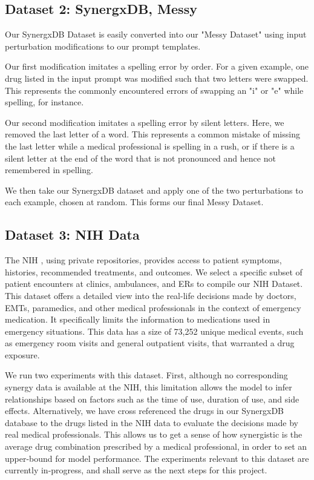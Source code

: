 \documentclass[11pt]{article}
\begin{document}
\subsection{Dataset 2: SynergxDB, Messy}
Our SynergxDB Dataset is easily converted into our "Messy Dataset" using input perturbation modifications to our prompt templates.

Our first modification imitates a spelling error by order. For a given example, one drug listed in the input prompt was modified such that two letters were swapped. This represents the commonly encountered errors of swapping an "i" or "e" while spelling, for instance.

Our second modification imitates a spelling error by silent letters. Here, we removed the last letter of a word. This represents a common mistake of missing the last letter while a medical professional is spelling in a rush, or if there is a silent letter at the end of the word that is not pronounced and hence not remembered in spelling.

We then take our SynergxDB dataset and apply one of the two perturbations to each example, chosen at random. This forms our final Messy Dataset.

\subsection{Dataset 3: NIH Data}
The NIH \cite{WinNT}, using private repositories, provides access to patient symptoms, histories, recommended treatments, and outcomes. We select a specific subset of patient encounters at clinics, ambulances, and ERs to compile our NIH Dataset. This dataset offers a detailed view into the real-life decisions made by doctors, EMTs, paramedics, and other medical professionals in the context of emergency medication. It specifically limits the information to medications used in emergency situations. This data has a size of 73,252 unique medical events, such as emergency room visits and general outpatient visits, that warranted a drug exposure.

We run two experiments with this dataset. First, although no corresponding synergy data is available at the NIH, this limitation allows the model to infer relationships based on factors such as the time of use, duration of use, and side effects. Alternatively, we have cross referenced the drugs in our SynergxDB database to the drugs listed in the NIH data to evaluate the decisions made by real medical professionals. This allows us to get a sense of how synergistic is the average drug combination prescribed by a medical professional, in order to set an upper-bound for model performance. The experiments relevant to this dataset are currently in-progress, and shall serve as the next steps for this project.
\end{document}
